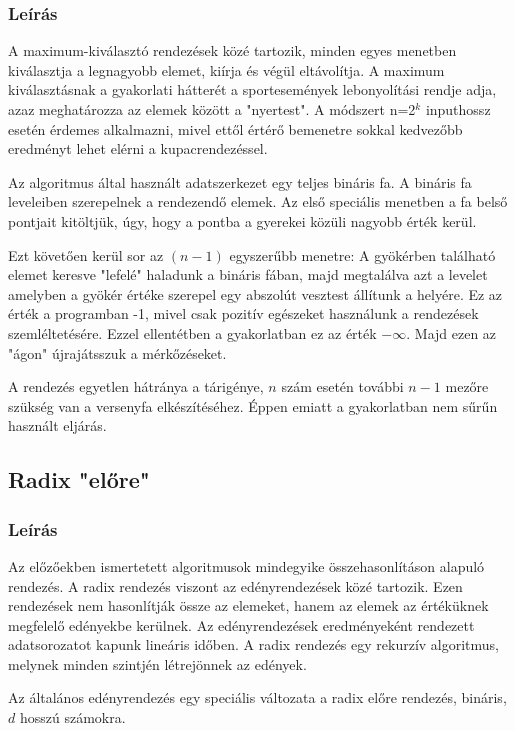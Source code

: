 \documentclass{elteikthesis}
\begin{document}
\subsubsection{Leírás}
A maximum-kiválasztó rendezések közé tartozik, minden egyes menetben kiválasztja a legnagyobb elemet, kiírja és végül eltávolítja. A maximum kiválasztásnak a gyakorlati hátterét a sportesemények lebonyolítási rendje adja, azaz meghatározza az elemek között a "nyertest"\cite{Fekete}. A módszert n=2$^k$ inputhossz esetén érdemes alkalmazni, mivel ettől értérő bemenetre sokkal kedvezőbb eredményt lehet elérni a kupacrendezéssel\cite{Fekete}. \par
Az algoritmus által használt adatszerkezet egy teljes bináris fa. A bináris fa leveleiben szerepelnek a rendezendő elemek. Az első speciális menetben a fa belső pontjait kitöltjük, úgy, hogy a pontba a gyerekei közüli nagyobb érték kerül.\par 
Ezt követően kerül sor az $(n-1)$ egyszerűbb menetre: A gyökérben található elemet keresve "lefelé" haladunk a bináris fában, majd megtalálva azt a levelet amelyben a gyökér értéke szerepel egy abszolút vesztest állítunk a helyére. Ez az érték a programban -1, mivel csak pozitív egészeket használunk a rendezések szemléltetésére. Ezzel ellentétben a gyakorlatban ez az érték $-\infty$. Majd ezen az "ágon" újrajátsszuk a mérkőzéseket.
\par
A rendezés egyetlen hátránya a tárigénye, $n$ szám esetén további $n-1$ mezőre szükség van a versenyfa elkészítéséhez. Éppen emiatt a gyakorlatban nem sűrűn használt eljárás.

\subsection{Radix "előre"}
\subsubsection{Leírás}
Az előzőekben ismertetett algoritmusok mindegyike összehasonlításon alapuló rendezés. A radix rendezés viszont az edényrendezések közé tartozik. Ezen rendezések nem hasonlítják össze az elemeket, hanem az elemek az értéküknek megfelelő edényekbe kerülnek. Az edényrendezések eredményeként rendezett adatsorozatot kapunk lineáris időben. 
A radix rendezés egy rekurzív algoritmus, melynek minden szintjén létrejönnek az edények.\par
Az általános edényrendezés egy speciális változata a radix előre rendezés, bináris, $d$ hosszú számokra.\par
\end{document}
